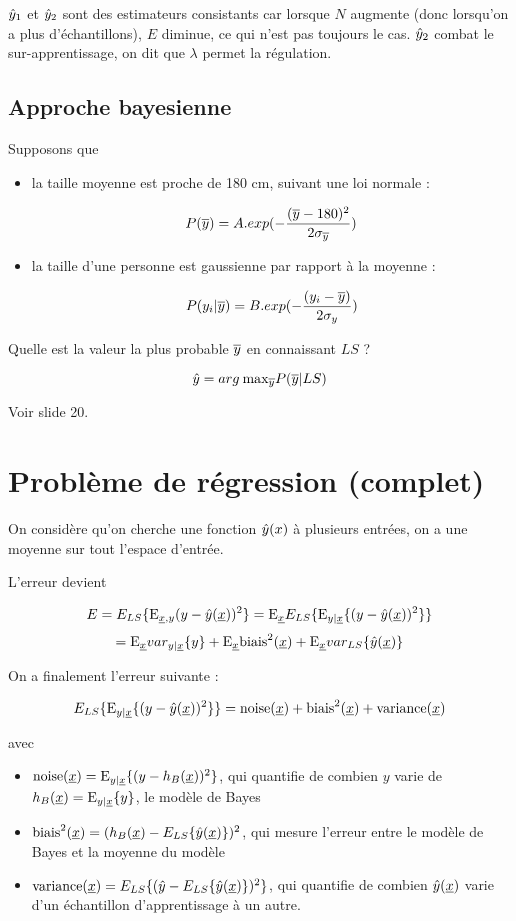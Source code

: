 	$\hat{y}_1$ et $\hat{y}_2$ sont des estimateurs consistants car lorsque $N$ augmente (donc lorsqu'on a plus d'échantillons), $E$ diminue, ce qui n'est pas toujours le cas. $\hat{y}_2$ combat le sur-apprentissage, on dit que $\lambda$ permet la régulation.
	
	
		\subsection{Approche bayesienne}
		
		Supposons que
		
		\begin{itemize}
			\item la taille moyenne est proche de 180 cm, suivant une loi normale :
			
			$$P(\overline{y}) = A.exp(- \frac{(\overline{y} - 180)^2}{2 \sigma_{\overline{y}}})$$
			
			\item la taille d'une personne est gaussienne par rapport à la moyenne :
			
			$$P(y_i \vert \overline{y} ) = B.exp(- \frac{(y_i - \overline{y})}{2 \sigma_y})$$
		\end{itemize}
		
		Quelle est la valeur la plus probable $\overline{y}$ en connaissant $LS$ ?
		
		$$\hat{y} = arg \: \text{max}_{\overline{y}} P(\overline{y} \vert LS)$$
		
		Voir slide 20.
	
	\section{Problème de régression (complet)}
	
	On considère qu'on cherche une fonction $\hat{y}(x)$ à plusieurs entrées, on a une moyenne sur tout l'espace d'entrée.
	
	L'erreur devient
	
	$$E = E_{LS}\{\text{E}_{\underline{x}, y}{(y - \hat{y}(\underline{x}))^2}\} = \text{E}_{\underline{x}}{E_{LS}\{\text{E}_{y \vert \underline{x}} \lbrace (y - \hat{y}(\underline{x}))^2 \rbrace\}}$$
	$$= \text{E}_{\underline{x}}{var_{y\vert \underline{x}}\{y\}} + \text{E}_{\underline{x}}{\text{biais}^2(\underline{x})} + \text{E}_{\underline{x}}{var_{LS}\{\hat{y}(\underline{x})\}}$$
	
	On a finalement l'erreur suivante :
	
	$$E_{LS}\{\text{E}_{y \vert \underline{x}} \lbrace (y - \hat{y}(\underline{x}))^2 \rbrace\} = \text{noise}(\underline{x}) + \text{biais}^2(\underline{x}) + \text{variance}(\underline{x})$$
	
	avec
	
	\begin{itemize}
		\item $\text{noise}(\underline{x}) = \text{E}_{y \vert \underline{x}} \lbrace (y - h_B(\underline{x}))^2 \rbrace$, qui quantifie de combien $y$ varie de $h_B(\underline{x}) = \text{E}_{y \vert \underline{x}} \lbrace y \rbrace$, le modèle de Bayes
		\item $\text{biais}^2(\underline{x}) = (h_B(\underline{x}) - E_{LS}\{\hat{y}(\underline{x})\})^2$, qui mesure l'erreur entre le modèle de Bayes et la moyenne du modèle
		\item $\text{variance}(\underline{x}) = E_{LS}\{(\hat{y} - E_{LS}\{\hat{y}(\underline{x})\})^2\}$, qui quantifie de combien $\hat{y}(\underline{x})$ varie d'un échantillon d'apprentissage à un autre.
	\end{itemize}
	
